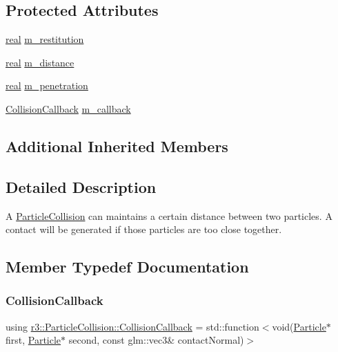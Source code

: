 \subsection*{Protected Attributes}
\begin{DoxyCompactItemize}
\item 
\mbox{\hyperlink{namespacer3_ab2016b3e3f743fb735afce242f0dc1eb}{real}} \mbox{\hyperlink{classr3_1_1_particle_collision_a02dd7e5f227a429bcb707ad46adeb292}{m\+\_\+restitution}}
\item 
\mbox{\hyperlink{namespacer3_ab2016b3e3f743fb735afce242f0dc1eb}{real}} \mbox{\hyperlink{classr3_1_1_particle_collision_a269b3beb261aee2fbd784210025cdebf}{m\+\_\+distance}}
\item 
\mbox{\hyperlink{namespacer3_ab2016b3e3f743fb735afce242f0dc1eb}{real}} \mbox{\hyperlink{classr3_1_1_particle_collision_a4e27e43b9a17e4a1d04ff91b808b4da9}{m\+\_\+penetration}}
\item 
\mbox{\hyperlink{classr3_1_1_particle_collision_a85d1a02ec35335322e5a3ce47f0e46cf}{Collision\+Callback}} \mbox{\hyperlink{classr3_1_1_particle_collision_aaa7e8c1e2b4cd1b635277548fb82bb4f}{m\+\_\+callback}}
\end{DoxyCompactItemize}
\subsection*{Additional Inherited Members}


\subsection{Detailed Description}
A \mbox{\hyperlink{classr3_1_1_particle_collision}{Particle\+Collision}} can maintains a certain distance between two particles. A contact will be generated if those particles are too close together. 

\subsection{Member Typedef Documentation}
\mbox{\label{classr3_1_1_particle_collision_a85d1a02ec35335322e5a3ce47f0e46cf}} 
\subsubsection{\texorpdfstring{Collision\+Callback}{CollisionCallback}}
{\footnotesize\ttfamily using \mbox{\hyperlink{classr3_1_1_particle_collision_a85d1a02ec35335322e5a3ce47f0e46cf}{r3\+::\+Particle\+Collision\+::\+Collision\+Callback}} =  std\+::function$<$void(\mbox{\hyperlink{classr3_1_1_particle}{Particle}}$\ast$ first, \mbox{\hyperlink{classr3_1_1_particle}{Particle}}$\ast$ second, const glm\+::vec3\& contact\+Normal)$>$}



